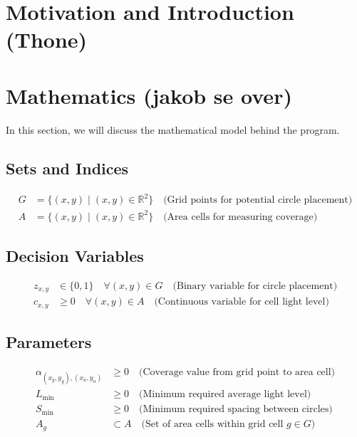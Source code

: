 \documentclass{article}
\begin{document}
\newpage

\section{Motivation and Introduction (Thone)}

\newpage

\section{Mathematics (jakob se over)}

In this section, we will discuss the mathematical model behind the program.

\subsection{Sets and Indices}
\begin{align}
    G &= \{(x, y) \mid (x, y) \in \mathbb{R}^2\} \quad \text{(Grid points for potential circle placement)}\\
    A &= \{(x, y) \mid (x, y) \in \mathbb{R}^2\} \quad \text{(Area cells for measuring coverage)}
\end{align}

\subsection{Decision Variables}
\begin{align}
    z_{x, y} &\in \{0, 1\} \quad \forall (x, y) \in G \quad \text{(Binary variable for circle placement)}\\
    c_{x, y} &\geq 0 \quad \forall (x, y) \in A \quad \text{(Continuous variable for cell light level)}
\end{align}

\subsection{Parameters}
\begin{align}
    \alpha_{(x_g, y_g), (x_a, y_a)} &\geq 0 \quad \text{(Coverage value from grid point to area cell)}\\
    L_{\min} &\geq 0 \quad \text{(Minimum required average light level)}\\
    S_{\min} &\geq 0 \quad \text{(Minimum required spacing between circles)}\\
    A_g &\subset A \quad \text{(Set of area cells within grid cell $g \in G$)}
\end{align}
\end{document}
